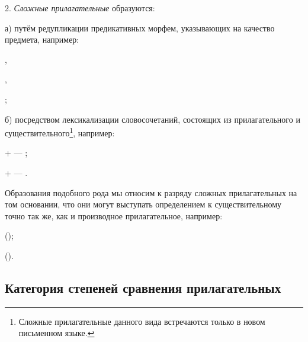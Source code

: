 2. \emph{Сложные прилагательные} образуются:

а) путём редупликации предикативных морфем, указывающих на качество предмета, например:
\begin{prfsample}
    \item {},
    \item {},
    \item {};
\end{prfsample}

б) посредством лексикализации словосочетаний, состоящих из прилагательного и существительного\footnote[28]{Сложные прилагательные данного вида встречаются только в новом письменном языке.}, например:
\begin{prfsample}
    \item {} +  --- ;
    \item {} +  --- .
\end{prfsample}
Образования подобного рода мы относим к разряду сложных прилагательных на том основании, что они могут выступать определением к существительному точно так же, как и производное прилагательное, например:
\begin{prfsample}
    \item {} ();
    \item {} ().
\end{prfsample}

\subsection{Категория степеней сравнения прилагательных}

